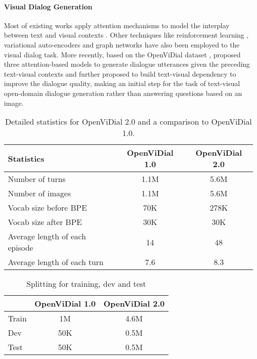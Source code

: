 \documentclass[11pt,a4paper]{article}
\begin{document}
\paragraph{Visual Dialog Generation} Most of existing works apply attention mechanisms to model the interplay between text and visual contexts \citep{lu2017best, kottur2018visual, jiang-bansal-2019-self, yang2019making, guo2019dual, niu2019recursive, kang2019dual, park2020multi, jiang2020dam}. Other techniques like reinforcement learning \citep{das2017learning, wu2018you}, variational auto-encoders \cite{massiceti2018flipdial} and graph networks \citep{zheng2019reasoning, jiang2020kbgn} have also been employed to the visual dialog task. More recently, based on the OpenViDial dataset \cite{meng2020openvidial}, \citet{wang2021modeling} proposed three attention-based models \cite{vaswani2017attention} to generate dialogue utterances given the preceding text-visual contexts and further proposed to build text-visual dependency to improve the dialogue quality, making an initial step for the task of text-visual open-domain dialogue generation rather than answering questions based on an image.


\begin{table*}
\centering
\begin{tabular}{lcc} \\\toprule
\textbf{Statistics} & \textbf{OpenViDial 1.0} & \textbf{OpenViDial 2.0} \\\midrule
Number of turns & 1.1M & 5.6M \\
Number of images & 1.1M & 5.6M \\
Vocab size before BPE & 70K & 278K \\
Vocab size after BPE & 30K & 30K \\
Average length of each episode & 14 & 48 \\
Average length of each turn & 7.6 & 8.3 \\\bottomrule
\end{tabular}
\caption{Detailed statistics for OpenViDial 2.0 and a comparison to OpenViDial 1.0.}
\label{tab:stats}
\end{table*}

\begin{table}[t]
\centering
\begin{tabular}{lcc} \\\toprule
& \textbf{OpenViDial 1.0} & \textbf{OpenViDial 2.0} \\\midrule
Train & 1M & 4.6M \\
Dev & 50K & 0.5M \\
Test & 50K & 0.5M \\\bottomrule
\end{tabular}
\caption{Splitting for training, dev and test}
\label{tab:split}
\end{table}
\end{document}

